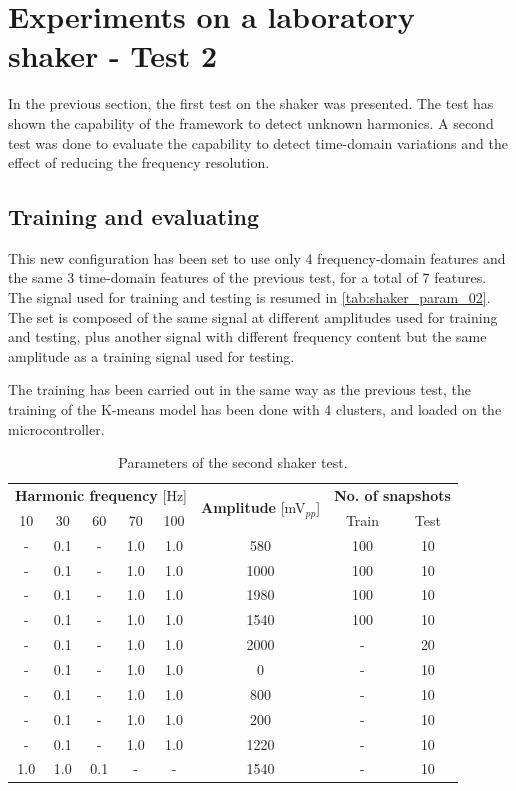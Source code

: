 \section{Experiments on a laboratory shaker - Test 2}
\label{sec:shaker_test02}
In the previous section, the first test on the shaker was presented. The test has shown the capability of the framework to detect unknown harmonics. A second test was done to evaluate the capability to detect time-domain variations and the effect of reducing the frequency resolution. 

\subsection{Training and evaluating}
This new configuration has been set to use only 4 frequency-domain features and the same 3 time-domain features of the previous test, for a total of 7 features. The signal used for training and testing is resumed in \autoref{tab:shaker_param_02}. The set is composed of the same signal at different amplitudes used for training and testing, plus another signal with different frequency content but the same amplitude as a training signal used for testing. 

The training has been carried out in the same way as the previous test, the training of the K-means model has been done with 4 clusters, and loaded on the microcontroller. 

\begin{table}
    \centering
    \caption{Parameters of the second shaker test.}
    \label{tab:shaker_param_02}
    \begin{tabular}{cccccccc} 
    \toprule
    \multicolumn{5}{c}{\textbf{Harmonic frequency} {[}Hz]} & \multirow{2}{*}{\textbf{Amplitude }{[}mV$_{pp}$]} & \multicolumn{2}{c}{\textbf{ No. of snapshots}} \\
    10 & 30 & 60 & 70 & 100 &  & Train & Test \\ 
    \hline
    - & 0.1 & - & 1.0 & 1.0 & 580 & 100 & 10 \\
    - & 0.1 & - & 1.0 & 1.0 & 1000 & 100 & 10 \\
    - & 0.1 & - & 1.0 & 1.0 & 1980 & 100 & 10 \\
    - & 0.1 & - & 1.0 & 1.0 & 1540 & 100 & 10 \\
    - & 0.1 & - & 1.0 & 1.0 & 2000 & - & 20 \\
    - & 0.1 & - & 1.0 & 1.0 & 0 & - & 10 \\
    - & 0.1 & - & 1.0 & 1.0 & 800 & - & 10 \\
    - & 0.1 & - & 1.0 & 1.0 & 200 & - & 10 \\
    - & 0.1 & - & 1.0 & 1.0 & 1220 & - & 10 \\
    1.0 & 1.0 & 0.1 & - & - & 1540 & - & 10 \\
    \bottomrule
    \end{tabular}
    \end{table}



